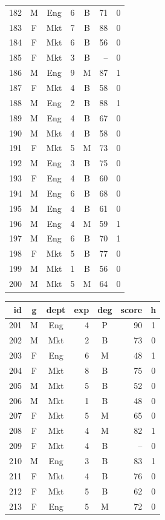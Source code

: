 \documentclass[11pt,a4paper]{article}
\begin{document}
\begin{center}
\begin{tabular}[t]{@{}r c c r c r c@{}}
182 & M & Eng & 6 & B & 71 & 0 \\
183 & F & Mkt & 7 & B & 88 & 0 \\
184 & F & Mkt & 6 & B & 56 & 0 \\
185 & F & Mkt & 3 & B & -- & 0 \\
186 & M & Eng & 9 & M & 87 & 1 \\
187 & F & Mkt & 4 & B & 58 & 0 \\
188 & M & Eng & 2 & B & 88 & 1 \\
189 & M & Eng & 4 & B & 67 & 0 \\
190 & M & Mkt & 4 & B & 58 & 0 \\
191 & F & Mkt & 5 & M & 73 & 0 \\
192 & M & Eng & 3 & B & 75 & 0 \\
193 & F & Eng & 4 & B & 60 & 0 \\
194 & M & Eng & 6 & B & 68 & 0 \\
195 & M & Eng & 4 & B & 61 & 0 \\
196 & M & Eng & 4 & M & 59 & 1 \\
197 & M & Eng & 6 & B & 70 & 1 \\
198 & F & Mkt & 5 & B & 77 & 0 \\
199 & M & Mkt & 1 & B & 56 & 0 \\
200 & M & Mkt & 5 & M & 64 & 0 \\
\bottomrule
\end{tabular}
\hfill
\begin{tabular}[t]{@{}r c c r c r c@{}}
\toprule
id & g & dept & exp & deg & score & h \\
\midrule
201 & M & Eng & 4 & P & 90 & 1 \\
202 & M & Mkt & 2 & B & 73 & 0 \\
203 & F & Eng & 6 & M & 48 & 1 \\
204 & F & Mkt & 8 & B & 75 & 0 \\
205 & M & Mkt & 5 & B & 52 & 0 \\
206 & M & Mkt & 1 & B & 48 & 0 \\
207 & F & Mkt & 5 & M & 65 & 0 \\
208 & F & Mkt & 4 & M & 82 & 1 \\
209 & F & Mkt & 4 & B & -- & 0 \\
210 & M & Eng & 3 & B & 83 & 1 \\
211 & F & Mkt & 4 & B & 76 & 0 \\
212 & F & Mkt & 5 & B & 62 & 0 \\
213 & F & Eng & 5 & M & 72 & 0 \\

\end{tabular}
\end{center}
\end{document}
